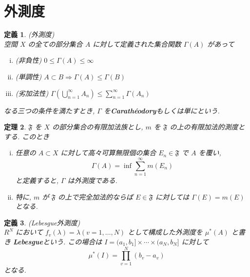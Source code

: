 \documentclass[dvipdfmx]{jsreport}
\newtheorem{theo}{定理}[section]
\newtheorem{defi}[theo]{定義}
\begin{document}
\section{外測度}

\begin{defi}
    (外測度) \\
    空間 $X$ の全ての部分集合 $A$ に対して定義された集合関数 $\Gamma(A)$ があって
    \begin{enumerate}[(i)]
        \item (非負性) $0 \leq \Gamma(A) \leq \infty$
        \item (単調性) $A \subset B \Rightarrow \Gamma(A) \leq \Gamma(B)$
        \item (劣加法性) $\displaystyle \Gamma\left( \bigcup_{n = 1}^\infty A_n \right) \leq \sum_{n = 1}^\infty \Gamma(A_n)$
    \end{enumerate}
    なる三つの条件を満たすとき,  $\Gamma$ を{\bf Carathéodory}もしくは単にという. 
\end{defi}

\begin{theo} \label{outer_measure}
    $\mathfrak{F}$ を $X$ の部分集合の有限加法族とし, $m$ を $\mathfrak{F}$ の上の有限加法的測度とする. このとき
    \begin{enumerate}[(i)]
        \item 任意の $A \subset X$ に対して高々可算無限個の集合 $E_n \in \mathfrak{F}$ で $A$ を覆い, 
        \begin{equation}
            \Gamma(A) = \inf \sum_{n = 1}^\infty m(E_n)
        \end{equation}
        と定義すると, $\Gamma$ は外測度である. 
        \item 特に, $m$ が $\mathfrak{F}$ の上で完全加法的ならば $E \in \mathfrak{F}$ に対しては $\Gamma(E) = m(E)$ となる. 
    \end{enumerate}
\end{theo}

\begin{defi}
    (Lebesgue外測度) \\
    $R^N$ において $f_v(\lambda) = \lambda (v = 1, \dots, N)$ として構成した外測度を $\mu^*(A)$ と書き {\bf Lebesgue}という. 
    この場合は $I = (a_1, b_1] \times \cdots \times (a_N, b_N]$ に対して
    \begin{equation}
        \mu^*(I) = \prod_{v = 1}^N (b_v - a_v)
    \end{equation}
    となる. 
\end{defi}
\end{document}
